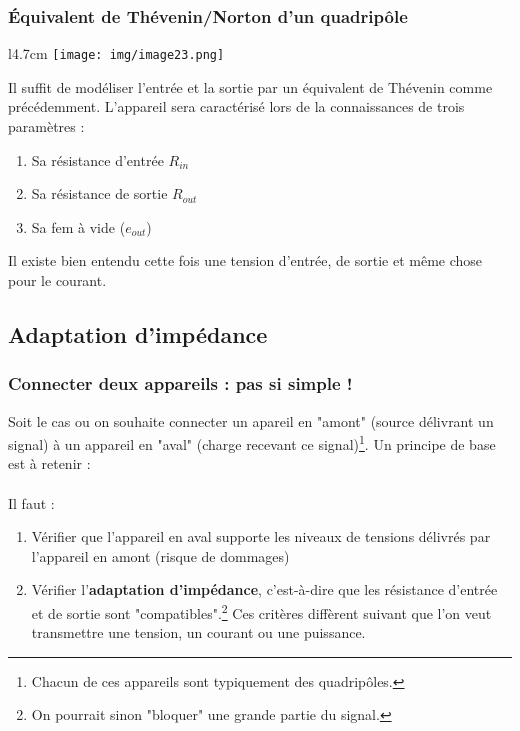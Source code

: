 \setcounter{subsection}{3}
\subsubsection{Équivalent de Thévenin/Norton d'un quadripôle}
\begin{wrapfigure}[8]{l}{4.7cm}
\texttt{[image: img/image23.png]}
\end{wrapfigure}
Il suffit de modéliser l'entrée et la sortie par un équivalent de Thévenin comme précédemment. L'appareil sera caractérisé lors de la connaissances de trois paramètres :
\begin{enumerate}
\item Sa résistance d'entrée $R_{in}$
\item Sa résistance de sortie $R_{out}$
\item Sa fem à vide ($e_{out}$)
\end{enumerate}
Il existe bien entendu cette fois une tension d'entrée, de sortie et même chose pour le courant.


\subsection{Adaptation d'impédance}
\subsubsection{Connecter deux appareils : pas si simple !}
Soit le cas ou on souhaite connecter un apareil en "amont" (source délivrant un signal) à un appareil en "aval" (charge recevant ce signal)\footnote{Chacun de ces appareils sont typiquement des quadripôles.}. Un principe de base est à retenir :\\
\ \\

Il faut :
\begin{enumerate}
\item Vérifier que l'appareil en aval supporte les niveaux de tensions délivrés par l'appareil en amont (risque de dommages)
\item Vérifier l'\textbf{adaptation d'impédance}, c'est-à-dire que les résistance d'entrée et de sortie sont "compatibles".\footnote{On pourrait sinon "bloquer" une grande partie du signal.} Ces critères diffèrent suivant que l'on veut transmettre une tension, un courant ou une puissance.
\end{enumerate}

